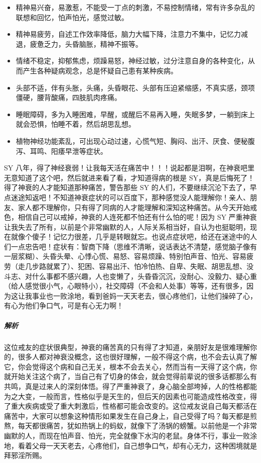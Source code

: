\begin{itemize}
    \item 精神易兴奋，易激惹，不能受一丁点的刺激，不易控制情绪，常有许多杂乱的联想和回忆，怕声怕光，感觉过敏。
    \item 精神易疲劳，自述工作效率降低，脑力大幅下降，注意力不集中，记忆力减退，疲惫乏力，头昏脑胀，精神不振等。
    \item 情绪不稳定，抑郁焦虑，烦躁易怒，神经过敏，过分注意自身的各种变化，从而产生各种疑病观念，总是怀疑自己患有某种疾病。
    \item 头部不适，伴有头胀，头痛，头昏眼花、头部有压迫紧缩感，不真实感，颈项僵硬，腰背酸痛，四肢肌肉疼痛。
    \item 睡眠障碍，多为入睡困难，早醒，或醒后不易再入睡，失眠多梦，一躺到床上就会恐惧，怕睡不着，然后胡思乱想。
    \item 植物神经功能紊乱，可出现心动过速，心慌气短、胸闷、出汗、厌食、便秘腹泻、耳鸣、阳痿早泄等症状。
\end{itemize}

\begin{case}[神经衰弱]
    SY 八年，得了神经衰弱！让我每天活在痛苦中！！！说起都是泪啊，在神衰吧里无意知道了这个吧，然后就进来看了看，才知道得病的根是 SY，真是后悔死了！得了神衰的人才能知道那种痛苦，警告那些 SY 的人们，不要继续沉沦下去了，早点迷途知返吧！不知道神衰症状的可以百度下，那种感觉没人能理解你！亲人、朋友、家人都不理解你，只有得了同病的人才能理解和深知这种痛苦。从今天开始戒色，相信自己可以戒掉，神衰的人连死都不怕还有什么怕的呢！因为 SY 严重神衰让我失去了所有，以前是个非常幽默的人，人际关系相当好，自认为也挺聪明，现在就像个傻子！记忆力很差，几乎是转眼就忘。也说点症状吧，给还在迷途中的人们一点忠告吧！症状有：智商下降（思维不清晰，说话表达不清楚，感觉脑子像有一层浆糊）、头昏头晕、心悸心慌、易怒、容易烦躁、特别怕声音、怕光、容易疲劳（走几步路就累了）、犯困、容易出汗、怕冷怕热、自卑、失眠、胡思乱想、没斗志、对什么事都不感兴趣，人也变懒了，头昏昏沉沉，没耐心、没毅力、疑心重（给人感觉很小气，心眼特小），社交障碍（不会和人处事）等等，还有很多，因为这让我事业也一败涂地，看到爸妈一天天老去，很心疼他们，让他们操碎了心，有心为他们争口气，可是有心无力啊！
    \subparagraph{解析} 这位戒友的症状很典型，神衰的痛苦真的只有得了才知道，亲朋好友是很难理解你的，很多人都对神衰没概念，这也很好理解，一般不得这个病，也不会去认真了解它，你会觉得这个病和自己无关，根本不会去关心，然而当有一天得了这个病，你就开始关注这个病了，当自己有了切身的体会，就会觉得前辈说的很多话都那么有共鸣，真是过来人的深刻体悟。得了严重神衰了，身心脑全部垮掉，人的性格都能为之大变，一般而言，性格似乎是天生的，但后天的因素也可能造成性格改变，得了重大疾病或受了重大刺激后，性格都可能会改变的。这位戒友说自己每天都活在痛苦中，大家可以想象这种情形如果发生在自己身上，自己受得了吗？每天都是煎熬，每天都很痛苦，犹如热锅上的蚂蚁，就像下了汤锅的螃蟹。以前他是一个非常幽默的人，而现在怕声音、怕光，完全就像下水沟的老鼠。身体不行，事业一败涂地，看着父母一天天老去，心疼他们，自己想争口气，却有心无力，这种困境就是拜邪淫所赐。
\end{case}

